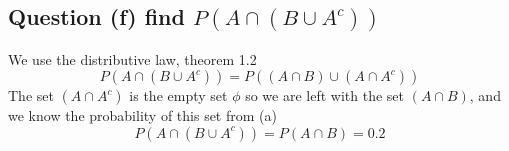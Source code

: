 \documentclass[12pt]{article}
\begin{document}
\subsection*{Question (f) find $P(A \cap(B\cup A^c))$}
We use the distributive law, theorem 1.2 \cite{STAT}
\[
P(A \cap(B\cup A^c)) = P((A\cap B) \cup (A\cap A^c))
\]
The set $(A\cap A^c)$ is the empty set $\phi$ so we are left with the set $(A \cap B)$, and we know the probability of this set from (a)
\[
P(A \cap(B\cup A^c)) = P(A \cap B) = 0.2
\]











\printbibliography %
\end{document}
